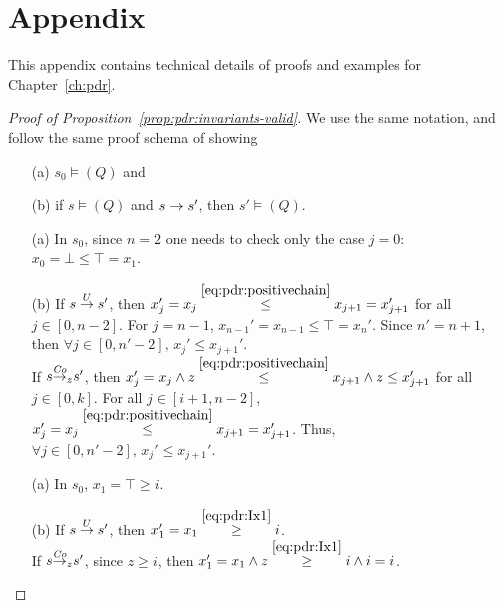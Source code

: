 
\chapter{Appendix}\label{ch:app:pdr}
This appendix contains technical details of proofs and examples for Chapter~\ref{ch:pdr}.

\begin{proof}[Proof of Proposition~\ref{prop:pdr:invariants-valid}]
	We use the same notation, and follow the same proof schema of showing
	\begin{itemize}
		\item[(a)] $s_0 \models (Q)$ and
		\item[(b)] if $s \models (Q)$ and $s \stackrel{ }{\to} s'$, then $s'\models (Q)$.
	\end{itemize}

	\begin{itemize}
		\item[(a)] In $s_0$, since $n=2$ one needs to check only the case $j=0$: $x_{0} = \bot \leq \top =x_1 $.
		\item[(b)] If $s \stackrel{U}{\to} s'$, then $x_j' =x_j \stackrel{{\eqref{eq:pdr:positivechain}}}{\leq}  x_{j+1} =x_{j+1}'$ for all $j\in[0,n-2]$. For $j=n-1$, $x_{n-1}' =x_{n-1} \leq \top =x_{n}'$. Since $n'=n+1$, then $\forall j\in [0,n'-2] \text{, } x_j'\leq x_{j+1}'$.\\
		      If $s {\stackrel{\mathit{Co}}{\to}}_{z} s'$, then $x_j' = x_j \land z \stackrel{{\eqref{eq:pdr:positivechain}}}{\leq} x_{j+1} \land z \leq x_{j+1}'$ for all $j\in[0,k]$.
		      For all $j\in [i+1,n-2]$, $x_j' = x_j \stackrel{{\eqref{eq:pdr:positivechain}}}{\leq} x_{j+1}  =x_{j+1}'$. Thus, $\forall j\in [0,n'-2] \text{, } x_j'\leq x_{j+1}'$.
	\end{itemize}

	\begin{itemize}
		\item[(a)] In $s_0$, $x_1 = \top \geq i$.
		\item[(b)] If $s \stackrel{U}{\to} s'$, then $x_1'=x_1 \stackrel{{\eqref{eq:pdr:Ix1}}}{\geq} i$. \\
		      If $s {\stackrel{\mathit{Co}}{\to}}_{z} s'$, since $z\geq i$,  then $x_1' = x_1\land z \stackrel{{\eqref{eq:pdr:Ix1}}}{\geq} i\land i = i$.
	\end{itemize}


\end{proof}
